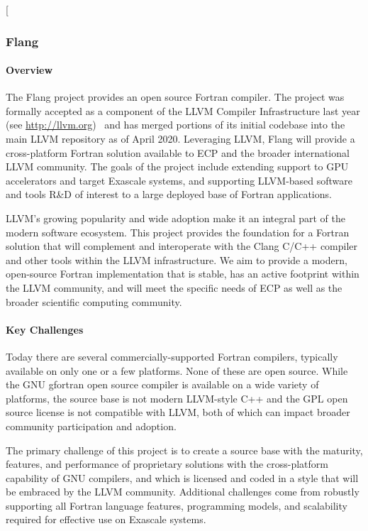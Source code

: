 [\subsubsection{ Flang}\label{subsubsect:flang}

\paragraph{Overview}

The Flang project provides an open source Fortran
\cite{iso-fortran-2004} \cite{iso-fortran-2010} \cite{iso-fortran-2018}
compiler.  The project was formally accepted as a component of the LLVM 
Compiler Infrastructure last year (see \url{http://llvm.org})~\cite{llvm:homepage} 
and has merged portions of its initial codebase into the main 
LLVM repository as of April 2020. Leveraging LLVM, Flang will provide a 
cross-platform Fortran solution available to ECP and the broader 
international LLVM community. The goals of the project include
extending support to GPU accelerators and target Exascale systems, and 
supporting LLVM-based software and tools R\&D of interest to a large 
deployed base of Fortran applications.

LLVM's growing popularity and wide adoption make it an integral part
of the modern software ecosystem. This project provides the foundation
for a Fortran solution that will complement and interoperate with the
Clang C/C++ compiler and other tools within the LLVM infrastructure.
We aim to provide a modern, open-source Fortran implementation that is
stable, has an active footprint within the LLVM community, and will
meet the specific needs of ECP as well as the broader scientific
computing community.

\paragraph{Key Challenges}
Today there are several commercially-supported Fortran compilers,
typically available on only one or a few platforms.  None of these are
open source.  While the GNU gfortran open source compiler is available
on a wide variety of platforms, the source base is not modern
LLVM-style C++ and the GPL open source license is not compatible with
LLVM, both of which can impact broader community participation and adoption.

The primary challenge of this project is to create a source base with
the maturity, features, and performance of proprietary solutions with
the cross-platform capability of GNU compilers, and which is licensed
and coded in a style that will be embraced by the LLVM community.
Additional challenges come from robustly supporting all Fortran
language features, programming models, and scalability required for 
effective use on Exascale systems. 

